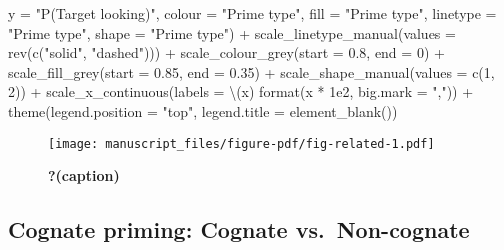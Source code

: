 \documentclass[
  letterpaper,
  DIV=11,
  numbers=noendperiod]{scrartcl}
\newenvironment{Shaded}{\begin{snugshade}}{\end{snugshade}}
\newcommand{\AttributeTok}[1]{\textcolor[rgb]{0.40,0.45,0.13}{#1}}
\newcommand{\DecValTok}[1]{\textcolor[rgb]{0.68,0.00,0.00}{#1}}
\newcommand{\FloatTok}[1]{\textcolor[rgb]{0.68,0.00,0.00}{#1}}
\newcommand{\FunctionTok}[1]{\textcolor[rgb]{0.28,0.35,0.67}{#1}}
\newcommand{\NormalTok}[1]{\textcolor[rgb]{0.00,0.23,0.31}{#1}}
\newcommand{\SpecialCharTok}[1]{\textcolor[rgb]{0.37,0.37,0.37}{#1}}
\newcommand{\StringTok}[1]{\textcolor[rgb]{0.13,0.47,0.30}{#1}}
\begin{document}
\begin{Shaded}
\begin{Highlighting}[]
         \AttributeTok{y =} \StringTok{"P(Target looking)"}\NormalTok{,}
         \AttributeTok{colour =} \StringTok{"Prime type"}\NormalTok{,}
         \AttributeTok{fill =} \StringTok{"Prime type"}\NormalTok{,}
         \AttributeTok{linetype =} \StringTok{"Prime type"}\NormalTok{,}
         \AttributeTok{shape =} \StringTok{"Prime type"}\NormalTok{) }\SpecialCharTok{+}
    \FunctionTok{scale\_linetype\_manual}\NormalTok{(}\AttributeTok{values =} \FunctionTok{rev}\NormalTok{(}\FunctionTok{c}\NormalTok{(}\StringTok{"solid"}\NormalTok{, }\StringTok{"dashed"}\NormalTok{))) }\SpecialCharTok{+}
    \FunctionTok{scale\_colour\_grey}\NormalTok{(}\AttributeTok{start =} \FloatTok{0.8}\NormalTok{, }\AttributeTok{end =} \DecValTok{0}\NormalTok{) }\SpecialCharTok{+}
    \FunctionTok{scale\_fill\_grey}\NormalTok{(}\AttributeTok{start =} \FloatTok{0.85}\NormalTok{, }\AttributeTok{end =} \FloatTok{0.35}\NormalTok{) }\SpecialCharTok{+}
    \FunctionTok{scale\_shape\_manual}\NormalTok{(}\AttributeTok{values =} \FunctionTok{c}\NormalTok{(}\DecValTok{1}\NormalTok{, }\DecValTok{2}\NormalTok{)) }\SpecialCharTok{+}
    \FunctionTok{scale\_x\_continuous}\NormalTok{(}\AttributeTok{labels =}\NormalTok{ \textbackslash{}(x) }\FunctionTok{format}\NormalTok{(x }\SpecialCharTok{*} \FloatTok{1e2}\NormalTok{, }\AttributeTok{big.mark =} \StringTok{","}\NormalTok{)) }\SpecialCharTok{+}
    \FunctionTok{theme}\NormalTok{(}\AttributeTok{legend.position =} \StringTok{"top"}\NormalTok{,}
          \AttributeTok{legend.title =} \FunctionTok{element\_blank}\NormalTok{())}
\end{Highlighting}
\end{Shaded}

\begin{figure}[H]

{\centering \texttt{[image: manuscript\_files/figure-pdf/fig-related-1.pdf]}

}

\caption{\label{fig-related}\textbf{?(caption)}}

\end{figure}

\hypertarget{cognate-priming-cognate-vs.-non-cognate}{%
\subsection{Cognate priming: Cognate
vs.~Non-cognate}\label{cognate-priming-cognate-vs.-non-cognate}}
\end{document}
